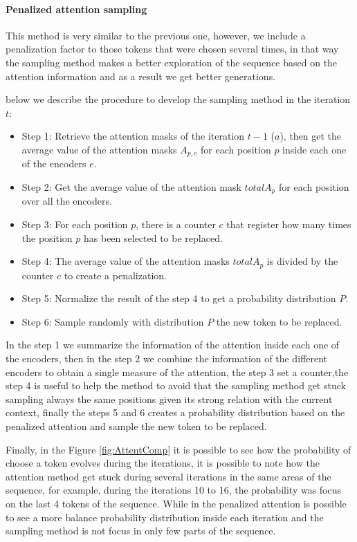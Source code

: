 \documentclass[10pt,twocolumn,letterpaper]{article}
\begin{document}
\paragraph{Penalized attention sampling}
This method is very similar to the previous one, however, we include a penalization factor
to those tokens that were chosen several times, in that way the sampling method makes a better
exploration of the sequence based on the attention information and as a result we get better
generations.

below we describe the procedure to develop the sampling method in the iteration $t$:

\begin{itemize}
\item Step 1: Retrieve the attention masks of the iteration $t-1$ ($a$), then get the average value of the attention masks $A_{p,e}$ for each position $p$ inside each one of the encoders $e$.
\item Step 2: Get the average value of the attention mask $totalA_{p}$ for each position over all the encoders.
\item Step 3: For each position $p$, there is a counter $c$ that register how many times the position $p$ has been selected to be replaced.
\item Step 4: The average value of the attention masks $totalA_{p}$ is divided by the counter $c$ to create a penalization.
\item Step 5: Normalize the result of the step 4 to get a probability distribution $P$.
\item Step 6: Sample randomly with distribution $P$ the new token to be replaced.
\end{itemize}

In the step 1 we summarize the information of the attention inside each one of the encoders,
then in the step 2 we combine the information of the different encoders to obtain a single
measure of the attention, the step 3 set a counter,the step 4 is useful to help the method to avoid that the sampling
method get stuck sampling always the same positions given its strong relation with the current
context, finally the steps 5 and 6 creates a probability distribution based on the penalized attention
and sample the new token to be replaced.

Finally, in the Figure \ref{fig:AttentComp} it is possible to see how the probability of choose a token evolves
during the iterations, it is possible to note how the attention method
get stuck during several iterations in the same areas of the sequence, for example, during the iterations
10 to 16, the probability was focus on the last 4 tokens of the sequence.
While in the penalized attention is possible to see a more balance probability distribution inside each iteration
and the sampling method is not focus in only few parts of the sequence.
\end{document}
